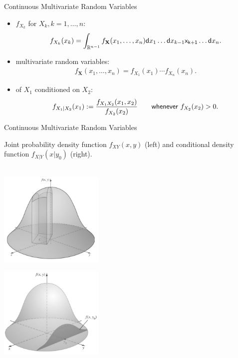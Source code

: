 \begin{frame}{Continuous Multivariate Random Variables}

\justifying
{} 
\begin{itemize}
\item {} $f_{X_k}$ for $X_k, k = 1, \ldots, n$:
\begin{align*}
f_{X_k}(x_k) = \int_{\mathbb{R}^{n-1}} f_{\mathbf{X}}(x_1, \ldots, x_n) \mathsf{d}x_1\ldots \mathsf{d}x_{k-1}\mathsf{x_{k+1}}\ldots \mathsf{d}x_n.
\end{align*}
\item {} multivariate random variables:
\begin{align*}
f_{\mathbf{X}}(x_1, \ldots, x_n) = f_{X_1}(x_1)\cdots f_{X_n}(x_n).
\end{align*}
\item {} of $X_1$ conditioned on $X_2$:
\begin{align*}
f_{X_1|X_2}(x_1) := \frac{f_{X_1X_2}(x_1, x_2)}{f_{X_2}(x_2)} \qquad \mathsf{whenever\ } f_{X_2}(x_2) > 0.
\end{align*}
\end{itemize}

\end{frame}


\begin{frame}{Continuous Multivariate Random Variables}

\justifying
{} Joint probability density function $f_{XY}(x, y)$ (left) and conditional density function $f_{X|Y}(x|y_0)$ (right).\\
~\\
\begin{minipage}{0.5\linewidth}
	\centering
	\includegraphics[width=5cm]{./images/rc3fig1.png}
\end{minipage}
\begin{minipage}{0.5\linewidth}
	\centering
	\includegraphics[width=5cm]{./images/rc3fig2.png}
\end{minipage}

\end{frame}


